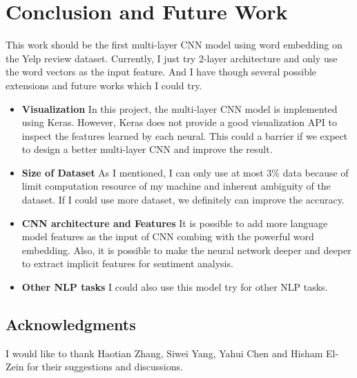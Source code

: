 \documentclass[11pt]{article}
\theoremstyle{definition}
\theoremstyle{basic}
\begin{document}
\section{Conclusion and Future Work}

This work should be the first multi-layer CNN model using word embedding on the Yelp review dataset.
Currently, I just try 2-layer architecture and only use the word vectors as the input feature.
And I have though several possible extensions and future works which I could try.

\begin{itemize}
    \item \textbf{Visualization}
    In this project, the multi-layer CNN model is implemented using Keras.
    However, Keras does not provide a good visualization API to inspect the features learned by each neural.
    This could a barrier if we expect to design a better multi-layer CNN and improve the result. 
    \item \textbf{Size of Dataset}
    As I mentioned, I can only use at most 3\% data because of limit computation resource of my machine and inherent ambiguity of the dataset.
    If I could use more dataset, we definitely can improve the accuracy.
    \item \textbf{CNN architecture and Features}
    It is possible to add more language model features as the input of CNN combing with the powerful word embedding.
    Also, it is possible to make the neural network deeper and deeper to extract implicit features for sentiment analysis.
    \item \textbf{Other NLP tasks}
    I could also use this model try for other NLP tasks.
\end{itemize}

\subsection*{Acknowledgments}

I would like to thank Haotian Zhang, Siwei Yang, Yahui Chen and Hisham El-Zein for their suggestions and discussions.




\end{document}
